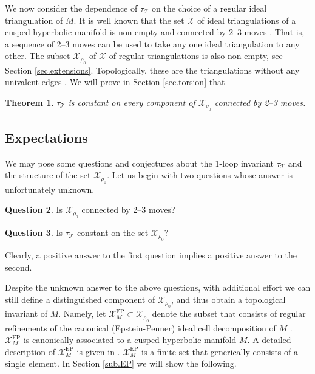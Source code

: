 \documentclass[12pt]{amsart}
\newcommand{\lbl}{\label}
\newtheorem{theorem}{Theorem}[section]
\theoremstyle{definition}
\newtheorem{question}[theorem]{Question}
\def\calX{\mathcal X}
\def\EP{\mathrm{EP}}
\newcommand{\CT}{\mathcal{T}}
\numberwithin{equation}{section}
\begin{document}
We now consider the dependence of $\tau_{\CT}$ on the choice of a regular
ideal triangulation of $M$. It is well known that the set
$\calX$ of ideal triangulations of a cusped 
hyperbolic manifold is non-empty \cite{Ca} and connected by 2--3 moves 
\cite{Ma1,Ma2,Pi}. That is, a sequence of 2--3 moves can be used to take 
any one ideal triangulation to any other. The subset $\calX_{\rho_0}$
of $\calX$ of regular triangulations is also 
non-empty, see Section \ref{sec.extensions}. Topologically, these are the 
triangulations without any univalent edges 
\cite{Champanerkar, BDR-V, DnG, Till}. 
We will prove in Section \ref{sec.torsion} that

\begin{theorem}
\lbl{thm.1}
$\tau_{\CT}$ is constant on every component of $\calX_{\rho_0}$ connected by 2--3 moves.
\end{theorem}




\subsection{Expectations}
\lbl{sub.ought}

We may pose some questions and conjectures about the 1-loop
invariant $\tau_{\CT}$ and the structure of the set $\calX_{\rho_0}$.
Let us begin with two questions whose answer is unfortunately
unknown.

\begin{question}
\lbl{que.can}
Is $\calX_{\rho_0}$ connected by 2--3 moves? 
\end{question}

\begin{question}
\lbl{que.constanttau}
Is $\tau_{\CT}$ constant on the set $\calX_{\rho_0}$?
\end{question}

\noindent Clearly, a positive answer to the first question implies a positive answer to the second.


Despite the unknown answer to the above questions, with additional effort we
can still define a distinguished component of $\calX_{\rho_0}$,
and thus obtain a topological invariant of $M$. Namely, let $\calX^{\EP}_M
\subset \calX_{\rho_0}$ denote the subset that consists of regular 
refinements of the canonical (Epstein-Penner) ideal cell decomposition of 
$M$ \cite{EP}. $\calX^{\EP}_M$ is canonically associated to a cusped
hyperbolic manifold $M$.
A detailed description of $\calX^{\EP}_M$ is given in \cite[Sec.6]{GHRS}.
$\calX^{\EP}_M$ is a finite set that generically consists
of a single element. In Section \ref{sub.EP} we will show the following.
\end{document}
